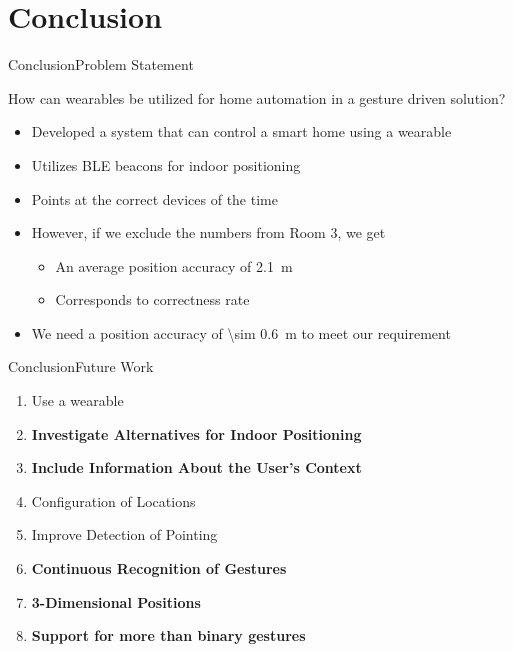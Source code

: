 \section{Conclusion}
\begin{frame}{Conclusion}{Problem Statement}
  \begin{framed}
    How can wearables be utilized for home automation in a gesture driven solution?
  \end{framed}
  
  \begin{itemize}
    \item<2-> Developed a system that can control a smart home using a wearable
    \item<2-> Utilizes BLE beacons for indoor positioning
    \item<2-> Points at the correct devices  of the time
    \item<2-> However, if we exclude the numbers from Room 3, we get
    \begin{itemize}
      \item<2-> An average position accuracy of \SI{2.1}{\meter}
      \item<2-> Corresponds to  correctness rate
    \end{itemize}
    \item<2-> We need a position accuracy of \SI{\sim 0.6}{\meter} to meet our requirement
  \end{itemize}
\end{frame}

\begin{frame}{Conclusion}{Future Work}
  \begin{enumerate}
    \item Use a wearable
    \item \textbf<2>{Investigate Alternatives for Indoor Positioning }
    \item \textbf<3>{Include Information About the User's Context}
    \item Configuration of Locations
    \item Improve Detection of Pointing
    \item \textbf<4>{Continuous Recognition of Gestures}
    \item \textbf<5>{3-Dimensional Positions}
    \item \textbf<6>{Support for more than binary gestures}
  \end{enumerate}
\end{frame}
